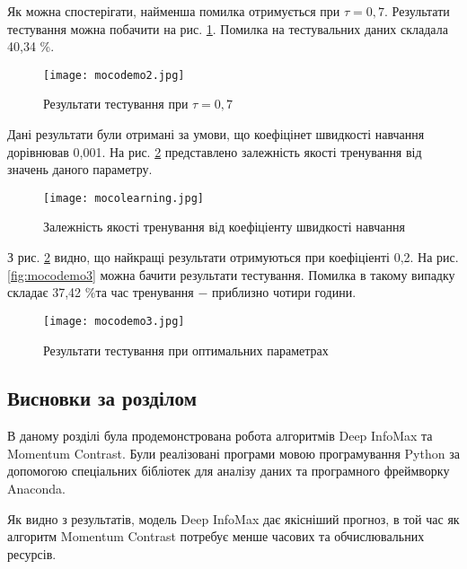 Як можна спостерігати, найменша помилка отримується при $\tau = 0,7$. Результати тестування можна побачити на рис. \ref{fig:deepinfodemo2}. Помилка на тестувальних даних складала 40,34 \%.


\begin{figure}[h]
  \texttt{[image: mocodemo2.jpg]}
  \caption{Результати тестування при $\tau = 0,7$}
  \label{fig:deepinfodemo2}
\end{figure}

Дані результати були отримані за умови, що коефіцінет швидкості навчання дорівнював 0,001. На рис. \ref{fig:mocolearning} представлено залежність якості тренування від значень даного параметру.

\begin{figure}[h]
  \texttt{[image: mocolearning.jpg]}
  \caption{Залежність якості тренування від коефіціенту швидкості навчання}
  \label{fig:mocolearning}
\end{figure}

\newpage

З рис. \ref{fig:mocolearning} видно, що найкращі результати отримуються при коефіціенті 0,2. На рис. \ref{fig:mocodemo3} можна бачити результати тестування. Помилка в такому випадку складає 37,42 \%та час тренування $-$ приблизно чотири години.


\begin{figure}[h!]
  \texttt{[image: mocodemo3.jpg]}
  \caption{Результати тестування при оптимальних параметрах}
  \label{fig:deepinfodemo3}
\end{figure}

\newpage

\subsection{Висновки за розділом}

В даному розділі була продемонстрована робота алгоритмів Deep InfoMax та Momentum Contrast. Були реалізовані програми мовою програмування Python за допомогою спеціальних бібліотек для аналізу даних та програмного фреймворку Anaconda. 

Як видно з результатів, модель Deep InfoMax дає якісніший прогноз, в той час як алгоритм Momentum Contrast потребує менше часових та обчислювальних ресурсів.
